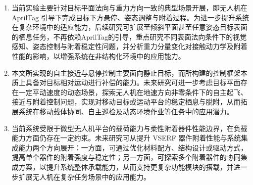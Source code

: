 \begin{enumerate}

\item 当前实验主要针对目标平面法向与重力方向一致的典型场景开展，即无人机在 AprilTag 引导下完成目标下方悬停、姿态调整与附着过程。为进一步提升系统在复杂环境中的适应能力，后续研究可扩展至倾斜平面甚至任意姿态目标表面的栖息任务，不再依赖AprilTag的引导，重点研究不同表面法向条件下的视觉感知、姿态控制与附着稳定性问题，并分析重力分量变化对接触动力学及附着性能的影响，以增强系统在非结构化环境中的应用能力。

\item 本文所实现的自主接近与悬停控制主要面向静止目标，而所构建的控制框架本质上具备对目标相对运动进行补偿的能力。未来研究可进一步考虑目标平面存在一定平动速度的动态场景，探索无人机在地速方向非零条件下的自主起飞、接近与附着控制问题，实现对移动目标或运动平台的稳定栖息与脱附，从而拓展系统在移动载体协同、自主巡检及动态环境作业等任务中的应用潜力。

\item 当前系统受限于微型无人机平台的载荷能力与柔性附着器件性能边界，在负载能力方面仍存在一定约束。未来研究可从提升 VSERF 器件附着性能与系统集成能力两个方向展开：一方面，可通过优化材料配方、结构设计或驱动方式，提高单个器件的附着强度与稳定性；另一方面，可探索多个附着器件的协同集成方案，以提升系统整体承载能力，从而支持更复杂功能模块的搭载，并进一步扩展无人机在复杂任务场景中的应用能力。

\end{enumerate}
